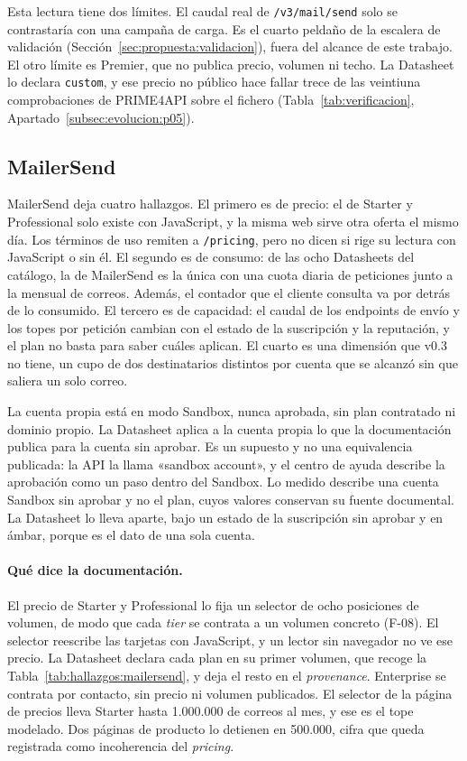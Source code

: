 Esta lectura tiene dos límites. El caudal real de \texttt{/v3/mail/send} solo
se contrastaría con una campaña de carga. Es el cuarto peldaño de la escalera
de validación (Sección~\ref{sec:propuesta:validacion}), fuera del alcance de
este trabajo. El otro límite es Premier, que no publica precio, volumen ni techo. La
Datasheet lo declara \texttt{custom}, y ese precio no público hace fallar
trece de las veintiuna comprobaciones de PRIME4API sobre el fichero
(Tabla~\ref{tab:verificacion}, Apartado~\ref{subsec:evolucion:p05}).

\subsection{MailerSend}
\label{subsec:hallazgos:mailersend}

MailerSend \citep{mailersendpricing,mailersenddocs} deja cuatro hallazgos. El
primero es de precio: el de Starter y Professional solo existe con JavaScript, y la
misma web sirve otra oferta el mismo día. Los términos de uso remiten a
\texttt{/pricing}, pero no dicen si rige su lectura con JavaScript o sin él. El
segundo es de consumo: de las ocho Datasheets del catálogo, la de MailerSend es la
única con una cuota diaria de peticiones junto a la mensual de correos. Además, el
contador que el cliente consulta va por detrás de lo consumido. El tercero es de
capacidad: el caudal de los endpoints de envío y los topes por petición cambian con
el estado de la suscripción y la reputación, y el plan no basta para saber cuáles aplican. El cuarto es una dimensión que v0.3 no tiene, un cupo de dos
destinatarios distintos por cuenta que se alcanzó sin que saliera un solo correo.

La cuenta propia está en modo Sandbox, nunca aprobada, sin plan contratado ni dominio
propio. La Datasheet aplica a la cuenta propia lo que la documentación publica para
la cuenta sin aprobar. Es un supuesto y no una equivalencia publicada: la API la llama
«sandbox account», y el centro de ayuda describe la aprobación como un paso dentro del
Sandbox. Lo medido describe una cuenta Sandbox sin aprobar y no el plan, cuyos valores conservan su fuente documental. La Datasheet lo lleva aparte, bajo un estado de la suscripción sin aprobar y en ámbar, porque es el dato de una sola cuenta.

\paragraph{Qué dice la documentación.}
El precio de Starter y Professional lo fija un selector de ocho posiciones de volumen,
de modo que cada \textit{tier} se contrata a un volumen concreto (F-08). El selector
reescribe las tarjetas con JavaScript, y un lector sin navegador no ve ese precio.
La Datasheet declara cada plan en su primer volumen, que recoge la
Tabla~\ref{tab:hallazgos:mailersend}, y deja el resto en el \textit{provenance}. Enterprise se
contrata por contacto, sin precio ni volumen publicados.
El selector de la página de precios lleva Starter hasta 1.000.000 de correos al mes, y ese es el tope modelado.
Dos páginas de producto lo detienen en 500.000, cifra que queda registrada como incoherencia del \textit{pricing}.

